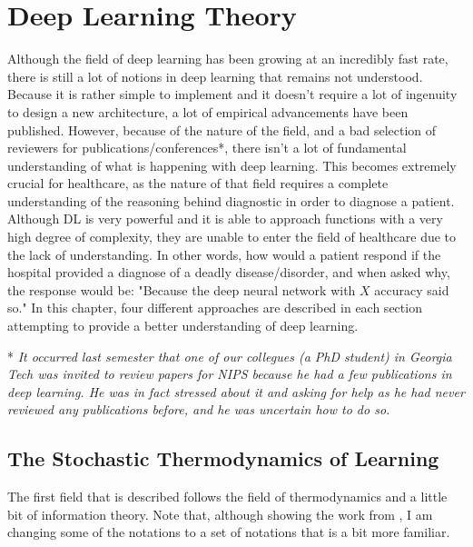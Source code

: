 \chapter{Deep Learning Theory}

Although the field of deep learning has been growing at an incredibly fast rate, there is still a lot of notions in deep learning that remains not understood. Because it is rather simple to implement and it doesn't require a lot of ingenuity to design a new architecture, a lot of empirical advancements have been published. However, because of the nature of the field, and a bad selection of reviewers for publications/conferences*, there isn't a lot of fundamental understanding of what is happening with deep learning. This becomes extremely crucial for healthcare, as the nature of that field requires a complete understanding of the reasoning behind diagnostic in order to diagnose a patient. Although DL is very powerful and it is able to approach functions with a very high degree of complexity, they are unable to enter the field of healthcare due to the lack of understanding. In other words, how would a patient respond if the hospital provided a diagnose of a deadly disease/disorder, and when asked why, the response would be: "Because the deep neural network with $X$ accuracy said so." In this chapter, four different approaches are described in each section attempting to provide a better understanding of deep learning.

* \textit{It occurred last semester that one of our collegues (a PhD student) in Georgia Tech was invited to review papers for NIPS because he had a few publications in deep learning. He was in fact stressed about it and asking for help as he had never reviewed any publications before, and he was uncertain how to do so.}

\section{The Stochastic Thermodynamics of Learning \cite{thermo}}
The first field that is described follows the field of thermodynamics and a little bit of information theory. Note that, although showing the work from \cite{thermo}, I am changing some of the notations to a set of notations that is a bit more familiar.

